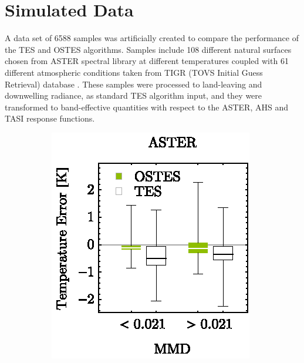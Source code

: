 \section{Simulated Data}

A data set of 6588 samples was artificially created to compare the performance of the TES and OSTES algorithms. Samples include 108 different natural surfaces chosen from ASTER spectral library \cite{BH09} at different temperatures coupled with 61 different atmospheric conditions taken from TIGR (TOVS Initial Guess Retrieval) database \cite{CS85, CC98}. 
These samples were processed to land-leaving and downwelling radiance, as standard TES algorithm input, and they were transformed to band-effective quantities with respect to the ASTER, AHS and TASI response functions.

\begin{figure}[!t]
	\centering
	\vspace{1em}
	\begin{subfigure}[t]{.3\linewidth}
		\centering
		\includegraphics[scale=1]{pics/Chapter_04/Simulated_data_ASTER.eps}
		

\end{subfigure}
\end{figure}
